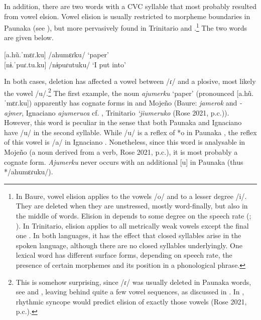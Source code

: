 In addition, there are two words with a CVC syllable that most probably resulted from vowel elsion. Vowel elision is usually restricted to morpheme boundaries in Paunaka (see ), but more pervasively found in Trinitario and .\footnote{In Baure, vowel elision applies to the vowels /o/ and to a lesser degree /i/. They are deleted when they are unstressed, mostly word-finally, but also in the middle of words. Elision in  depends to some degree on the speech rate (\citealp[cf.][53--54]{Danielsen2007}; \citealt{BaptistaWallin1968}). In Trinitario, elision applies to all metrically weak vowels except the final one \citep[cf.][1]{Rose2019}. In both languages, it has the effect that closed syllables arise in the spoken language, although there are no closed syllables underlyingly. One lexical word has different surface forms, depending on speech rate, the presence of certain morphemes and its position in a phonological phrase.} The two words are given below.

\ea\label{ex:CVCnative}
    [a.hũ.ˈmɛɾ.ku] \tab /ahumɛɾku/ \tab\tab ‘paper’\\
    {[}nɨ.ˈpuɾ.tu.ku] \tab /nɨpuɾutuku/ \tab ‘I put into’\\%
    \xe

In both cases, deletion has affected a vowel between /ɾ/ and a plosive, most likely the vowel /u/.\footnote{This is somehow surprising, since /ɾ/ was usually deleted in Paunaka words, see  and \citet[]{deCarvalhoPAU}, leaving behind quite a few vowel sequences, as discussed in . In , rhythmic syncope would predict elision of exactly those vowels (Rose 2021, p.c.).} The first example, the noun \textit{ajumerku} ‘paper’ (pronounced [a.hũ.ˈmɛɾ.ku]) apparently has cognate forms in  and Mojeño (Baure: \textit{jame\-rok} and \textit{-ajmer}, Ignaciano \textit{ajumeruca} cf. \citealt[885]{OlzaZubiri2004}, Trinitario \textit{‘jiumeruko} (Rose 2021, p.c.)). However, this word is peculiar in the sense that both Paunaka and Ignaciano have /u/ in the second syllable. While /u/ is a reflex of *o in Paunaka \citep[]{deCarvalhoPAU}, the reflex of this vowel is /a/ in Ignaciano \citep[]{CarvalhoRose2018}. Nonetheless, since this word is analysable in Mojeño (a noun derived from a verb, Rose 2021, p.c.), it is most probably a cognate form. \textit{Ajumerku} never occurs with an additional [u] in Paunaka (thus */ahumɛɾuku/).

